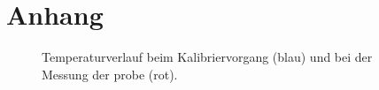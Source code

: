 \chapter{Anhang}
	\begin{figure}
		\centering
		
		\caption[Temperaturverlauf der Kalibrierung und der Messung]{Temperaturverlauf beim Kalibriervorgang (blau) und bei der Messung der probe (rot).}
		\label{fig:tempverlauf}
	\end{figure}